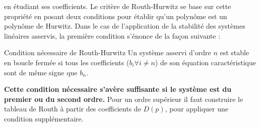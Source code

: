 en étudiant ses coefficients. Le critère de Routh-Hurwitz se base sur 
cette propriété en posant deux conditions pour établir qu'un polynôme est 
un polynôme de Hurwitz. Dans le cas de l'application de la stabilité des 
systèmes linéaires asservis, la première condition s'énonce 
de la façon suivante :
\begin{criteria}{Condition nécessaire de Routh-Hurwitz }
    Un système asservi d'ordre $n$ est stable en boucle fermée 
    si tous les coefficients ($b_i\forall i\neq n$) de son équation 
    caractéristique sont de même signe que $b_n$.
\end{criteria}
\textbf{Cette condition nécessaire s'avère suffisante si le système est du 
premier ou du second ordre.} Pour un ordre supérieur il faut construire le 
tableau de Routh à partir des coefficients de $D(p)$,
pour appliquer une condition supplémentaire. 
